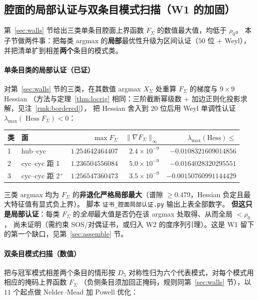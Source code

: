 \documentclass[UTF8,11pt]{ctexart}
\theoremstyle{definition}
\begin{document}
\subsection{腔面的局部认证与双条目模式扫描（W1 的加固）}\label{sec:wallcert}

第~\ref{sec:walls} 节给出三类单条目腔面上界函数 $F_\Sigma$ 的数值最大值，均低于 $\rho_0$。
本子节做两件事：把每类 argmax 的\textbf{局部}最优性升级为区间认证（$50$ 位 + Weyl），
并把清单扩到相差\textbf{两个}条目的模式类。

\paragraph{单条目类的局部认证（已证）}
对第~\ref{sec:walls} 节的三类，在其数值 argmax $X_\Sigma$ 处重算 $F_\Sigma$ 的梯度与 $9\times9$ Hessian
（方法与定理~\ref{thm:locrig} 相同：三阶截断幂级数 + 加边正则化投影求解，见注~\ref{rmk:bordered}），
把 Hessian 舍入到 $20$ 位后用 Weyl 单调性认证 $\lambda_{\max}(\operatorname{Hess}F_\Sigma)<0$：

\begin{center}
{\small
\begin{tabular}{@{}llrrr@{}}
\toprule
类 & 面 & $\max F_\Sigma$ & $\lVert\nabla F_\Sigma\rVert_\infty$ & $\lambda_{\max}(\mathrm{Hess})\le$ \\
\midrule
1 & hub--cyc          & $1.254642464407$ & $2.4\times10^{-9}$ & $-0.0108321609014856$ \\
2 & cyc--cyc 距 1     & $1.236504556084$ & $5.0\times10^{-9}$ & $-0.0164028320295551$ \\
3 & cyc--cyc 距 2$^+$ & $1.256547360473$ & $3.5\times10^{-9}$ & $-0.00150760991144429$ \\
\bottomrule
\end{tabular}}
\end{center}

三类 argmax 均为 $F_\Sigma$ 的\textbf{非退化严格局部最大}（谱隙 $\ge0.479$，Hessian 负定且最大特征值有显式负上界）。
脚本 \texttt{证书\_腔面局部认证.py} 输出上表全部数字。
\textbf{但这只是局部认证}：每类 $F_\Sigma$ 的\emph{全局}最大值是否仍在该 argmax 处取得、从而全局 $<\rho_0$，
尚未证明（需约束 SOS/对偶证书，或归入 W2 的度序列引理）。这是 W1 留下的第一个缺口，见第~\ref{sec:assemble} 节。

\paragraph{双条目模式扫描（数值）}
把与冠军模式相差两个条目的情形按 $D_5$ 对称性归为六个代表模式，对每个模式用相应的掩码上界函数 $F_\Sigma$
（负侧条目须加回正掩码，规则同第~\ref{sec:walls} 节），以 $11$ 个起点做 Nelder--Mead 加 Powell 优化：
\end{document}
